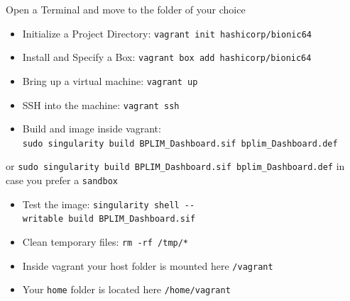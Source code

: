 \documentclass[
  12pt,
]{article}
\begin{document}
Open a Terminal and move to the folder of your choice

\begin{itemize}
\item
  Initialize a Project Directory:
  \texttt{vagrant\ init\ hashicorp/bionic64}
\item
  Install and Specify a Box:
  \texttt{vagrant\ box\ add\ hashicorp/bionic64}
\item
  Bring up a virtual machine: \texttt{vagrant\ up}
\item
  SSH into the machine: \texttt{vagrant\ ssh}
\item
  Build and image inside vagrant:
  \texttt{sudo\ singularity\ build\ BPLIM\_Dashboard.sif\ bplim\_Dashboard.def}
\end{itemize}

or
\texttt{sudo\ singularity\ build\ BPLIM\_Dashboard.sif\ bplim\_Dashboard.def}
in case you prefer a \texttt{sandbox}

\begin{itemize}
\item
  Test the image:
  \texttt{singularity\ shell\ -\/-writable\ build\ BPLIM\_Dashboard.sif}
\item
  Clean temporary files: \texttt{rm\ -rf\ /tmp/*}
\item
  Inside vagrant your host folder is mounted here \texttt{/vagrant}
\item
  Your \texttt{home} folder is located here \texttt{/home/vagrant}
\end{itemize}
\end{document}
